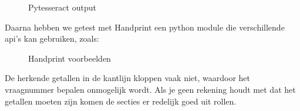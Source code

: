 \documentclass[12pt]{article}
\begin{document}
\begin{multicols}{2}
\begin{figure}[H]
    \caption{Pytesseract output}
    \label{fig:enter-label}
\end{figure}
Daarna hebben we getest met Handprint een python module die verschillende api's kan gebruiken, zoals:
\begin{figure}[H]%
    \centering
    \qquad
    \caption{Handprint voorbeelden}%
    \label{fig:example}%
\end{figure}
De herkende getallen in de kantlijn kloppen vaak niet, waardoor het vraagnummer bepalen onmogelijk wordt. Als je geen rekening houdt met dat het getallen moeten zijn komen de secties er redelijk goed uit rollen.

\end{multicols}
\end{document}
